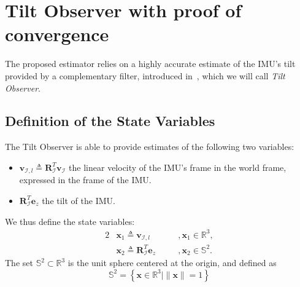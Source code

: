 \documentclass{IJCAS}
\begin{document}
\section{Tilt Observer with proof of convergence}
The proposed estimator relies on a highly accurate estimate of the IMU's tilt provided by a complementary filter, introduced in~\cite{benallegue2020LyapunovStableOrientationEstimatorHumanoids}, which we will call \emph{Tilt Observer}. 

\subsection{Definition of the State Variables}
The Tilt Observer is able to provide estimates of the following two variables: 
\begin{itemize}
    \item $\boldsymbol{v}_{\mathcal{I}, l} \triangleq \boldsymbol{R}^{T}_{\mathcal{I}} \boldsymbol{v}_{\mathcal{I}} $ the linear velocity of the IMU's frame in the world frame, expressed in the frame of the IMU.
    \item $\boldsymbol{R}^{T}_{\mathcal{I}} \boldsymbol{e}_z$ the tilt of the IMU.
\end{itemize}
We thus define the state variables: 
\begin{alignat}{2}
&\boldsymbol{x}_{1} \triangleq \boldsymbol{v}_{\mathcal{I}, l} \quad &&, \boldsymbol{x}_{1} \in \mathbb{R}^{3}, \label{eq:x1} \\
&\boldsymbol{x}_{2} \triangleq \boldsymbol{R}^{T}_{\mathcal{I}} \boldsymbol{e}_z \quad &&, \boldsymbol{x}_{2} \in \mathbb{S}^{2}. \label{eq:x2}
\end{alignat} 
The set $\mathbb{S}^{2} \subset \mathbb{R}^{3}$ is the unit sphere centered at the origin, and defined as
\begin{equation}
    \mathbb{S}^{2} = \left\{ \boldsymbol{x} \in \mathbb{R}^{3} \vert \lVert \boldsymbol{x} \rVert=1 \right\}
\end{equation}
\end{document}
